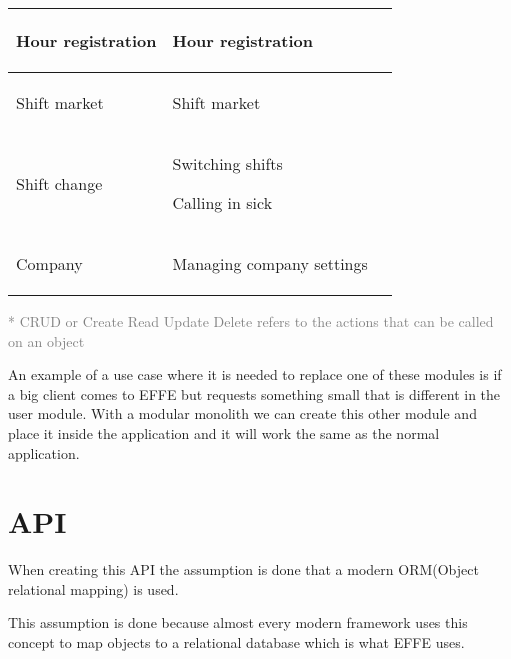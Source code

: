 \begin{tabularx}{\linewidth}{|>{}X|>{}X|>{}X|}
    Hour registration
     &
    \begin{compactitem}
        \item Hour registration
    \end{compactitem}
    \\ \hline

    Shift market
     &
    \begin{compactitem}
        \item Shift market
    \end{compactitem}
    \\ \hline

    Shift change
     &
    \begin{compactitem}
        \item Switching shifts
        \item Calling in sick
    \end{compactitem}
    \\ \hline

    Company
     &
    \begin{compactitem}
        \item Managing company settings
    \end{compactitem}
    \\ \hline
\end{tabularx}

\small{\textcolor{gray}{* CRUD or Create Read Update Delete refers to the actions that can be called on an object}}

An example of a use case where it is needed to replace one of these modules is if a big client comes to EFFE but requests something small that is different in the user module. With a modular monolith we can create this other module and place it inside the application and it will work the same as the normal application.

\section{API}
\label{sec:API}

When creating this API the assumption is done that a modern ORM(Object relational mapping) is used.


This assumption is done because almost every modern framework uses this concept to map objects to a relational database which is what EFFE uses.


